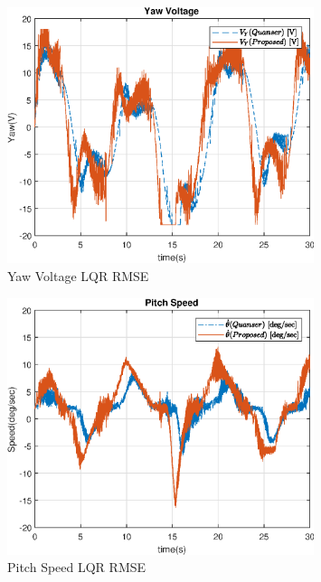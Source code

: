 \documentclass[fontsize=11pt, %
                             paper=letter, %
                             openany, %
                             captions=tableheading,
                             index=totoc,
                             hyperref]{labbook}
\begin{document}
\begin{addmargin}[0cm]{0cm}
\begin{figure}
  \centering
  \includegraphics[width=0.8\textwidth]{figs/img/02262019/YawVoltage_LQR_RMSE.eps}
  \caption{Yaw Voltage LQR RMSE}
  \label{fig:YawVoltage_LQR_RMSE}
\end{figure}

\begin{figure}
  \centering
  \includegraphics[width=0.8\textwidth]{figs/img/02262019/PitchSpeed_LQR_RMSE.eps}
  \caption{Pitch Speed LQR RMSE}
  \label{fig:PitchSpeed_LQR_RMSE}
\end{figure}


\end{addmargin}
\end{document}

